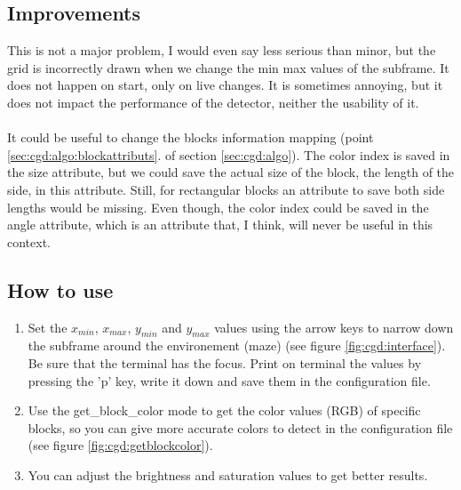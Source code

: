 \subsection{Improvements}
\label{sec:cgd:improvements}

This is not a major problem, I would even say less serious than 
minor, but the grid is incorrectly drawn when we change the 
min max values of the subframe. It does not happen on start, 
only on live changes. It is sometimes annoying, but it does not 
impact the performance of the detector, neither the usability of it.
\\
\\
It could be useful to change the blocks information mapping 
(point \ref{sec:cgd:algo:blockattributs}. of 
section \ref{sec:cgd:algo}). The color 
index is saved in the size attribute, but we could save the 
actual size of the block, the length of the side, in this attribute. 
Still, for rectangular blocks an attribute to save both side lengths 
would be missing. Even though, the color index could be saved in the 
angle attribute, which is an attribute that,
I think, will never be useful in this context. 

\subsection{How to use}
\label{sec:cgd:howto}
    \begin{enumerate}
        \item Set the $x_{min}$, $x_{max}$, $y_{min}$ and $y_{max}$ 
            values using the arrow keys
            to narrow down the subframe around the environement (maze)
            (see figure \ref{fig:cgd:interface}). Be sure 
            that the terminal has the focus. Print on terminal the values
            by pressing the 'p' key, 
            write it down and save them in the configuration file.
        \item Use the get\_block\_color mode to get the color values (RGB) 
            of specific blocks, so you can give more accurate colors to 
            detect in the configuration file (see 
            figure \ref{fig:cgd:getblockcolor}).
        \item You can adjust the brightness and saturation values to get 
            better results.
    \end{enumerate}

